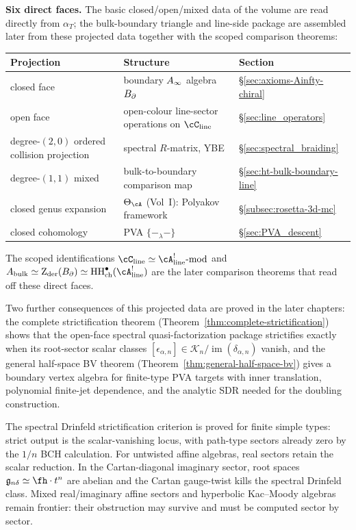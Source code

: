 \medskip
\noindent\textbf{Six direct faces.}\enspace
The basic closed/open/mixed data of the volume are read directly
from $\alpha_T$; the bulk-boundary triangle and line-side package are
assembled later from these projected data together with the scoped
comparison theorems:
\begin{center}
\small
\renewcommand{\arraystretch}{1.15}
\begin{tabular}{lll}
\textbf{Projection} & \textbf{Structure} & \textbf{Section} \\
\hline
closed face
 & boundary $A_\infty$ algebra $B_{\partial}$
 & \S\ref{sec:axioms-Ainfty-chiral} \\[2pt]
open face
 & open-colour line-sector operations on $\cC_{\mathrm{line}}$
 & \S\ref{sec:line_operators} \\[2pt]
degree-$(2,0)$ ordered collision projection
 & spectral $R$-matrix, YBE
 & \S\ref{sec:spectral_braiding} \\[2pt]
degree-$(1,1)$ mixed
 & bulk-to-boundary comparison map
 & \S\ref{sec:ht-bulk-boundary-line} \\[2pt]
closed genus expansion
 & $\Theta_\cA$ (Vol~I): Polyakov framework
 & \S\ref{subsec:rosetta-3d-mc} \\[2pt]
closed cohomology
 & PVA $\{-_\lambda-\}$
 & \S\ref{sec:PVA_descent}
\end{tabular}
\end{center}
\noindent
The scoped identifications
$\cC_{\mathrm{line}} \simeq \cA^!_{\mathrm{line}}\text{-mod}$ and
$\Abulk \simeq \Zder(\Bbound) \simeq
\HH^\bullet_{\mathrm{ch}}(\cA^!_{\mathrm{line}})$ are the later
comparison theorems that read off these direct faces.

\medskip
\noindent
Two further consequences of this projected data are proved in the
later chapters:
the complete strictification theorem
(Theorem~\ref{thm:complete-strictification}) shows that the open-face
spectral quasi-factorization package strictifies exactly when its
root-sector scalar classes
$[\epsilon_{\alpha,n}]\in
\mathscr K_n/\operatorname{im}(\delta_{\alpha,n})$ vanish, and the
general half-space BV
theorem (Theorem~\ref{thm:general-half-space-bv}) gives a boundary
vertex algebra for finite-type PVA targets with inner translation,
polynomial finite-jet dependence, and the analytic SDR needed for the
doubling construction.

The spectral Drinfeld strictification criterion is proved for finite
simple types: strict output is the scalar-vanishing locus, with
path-type sectors already zero by the $1/n$ BCH calculation.  For
untwisted affine algebras, real sectors retain the scalar reduction.
In the Cartan-diagonal imaginary sector, root spaces
$\fg_{n\delta} \simeq \fh \cdot t^n$ are abelian and the Cartan
gauge-twist kills the spectral Drinfeld class.  Mixed real/imaginary
affine sectors and hyperbolic Kac--Moody algebras remain frontier:
their obstruction may survive and must be computed sector by sector.

